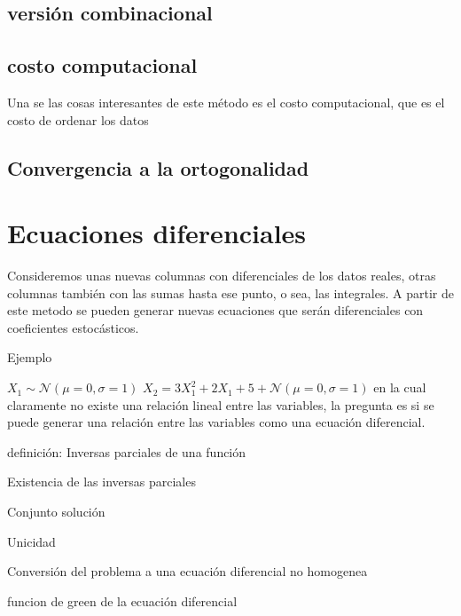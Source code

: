 \documentclass{article}
\begin{document}
\section{versión combinacional}

\section{costo computacional}
Una se las cosas interesantes de este método es el costo computacional, que es el costo de ordenar los datos

\section{Convergencia a la ortogonalidad}



\chapter{Ecuaciones diferenciales}
Consideremos unas nuevas columnas con diferenciales de los datos reales, otras columnas también con las sumas hasta ese punto, o sea, las integrales. A partir de este metodo se pueden generar nuevas ecuaciones que serán diferenciales con coeficientes estocásticos.

Ejemplo

$X_1\sim \mathcal{N}\left(\mu=0,\sigma=1\right)$
$X_2 = 3X_1^2+2X_1+5+\mathcal{N}\left(\mu=0,\sigma=1\right)$ en la cual claramente no existe una relación lineal entre las variables, la pregunta es si se puede generar una relación entre las variables como una ecuación diferencial.

definición: Inversas parciales de una función

Existencia de las inversas parciales

Conjunto solución

Unicidad

Conversión del problema a una ecuación diferencial no homogenea

funcion de green de la ecuación diferencial
\end{document}
